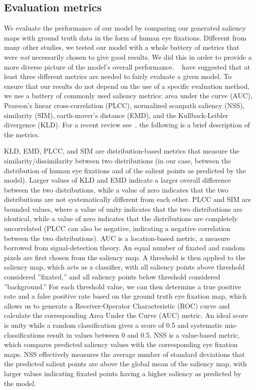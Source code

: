 \subsection{Evaluation metrics}

We evaluate the performance of our model by comparing our generated saliency maps with ground truth data in the form of human eye fixations. Different from many other studies, we tested our model with a whole battery of metrics that were {\em not} necessarily chosen to give good results. We did this in order to provide a more diverse picture of the model's overall performance. ~\cite{Riche_etal13} have suggested that at least three different metrics are needed to fairly evaluate a given model. To ensure that our results do not depend on the use of a specific evaluation method, we use a battery of commonly used saliency metrics: area under the curve (AUC), Pearson's linear cross-correlation (PLCC), normalized scanpath saliency (NSS), similarity (SIM), earth-mover's distance (EMD), and the Kullback-Leibler divergence (KLD). For a recent review see~\cite{Riche_etal13}, the following is a brief description of the metrics.

KLD, EMD, PLCC, and SIM are distribution-based metrics that measure the similarity/dissimilarity between two distributions (in our case, between the distribution of human eye fixations and of the salient points as predicted by the model). Larger values of KLD and EMD indicate a larger overall difference between the two distributions, while a value of zero indicates that the two distributions are not systematically different from each other. PLCC and SIM are bounded values, where a value of unity indicates that the two distributions are identical, while a value of zero indicates that the distributions are completely uncorrelated (PLCC can also be negative, indicating a negative correlation between the two distributions). AUC is a location-based metric, a measure borrowed from signal-detection theory. An equal number of fixated and random pixels are first chosen from the saliency map. A threshold is then applied to the saliency map, which acts as a classifier, with all saliency points above threshold considered ''fixated,'' and all saliency points below threshold considered ''background.'' For each threshold value, we can then determine a true positive rate and a false positive rate based on the ground truth eye fixation map, which allows us to generate a Receiver-Operator Characteristic (ROC) curve and calculate the corresponding Area Under the Curve (AUC) metric. An ideal score is unity while a random classification gives a score of 0.5 and systematic mis-classifications result in values between 0 and 0.5. NSS is a value-based metric, which compares predicted saliency values with the corresponding eye fixation maps. NSS effectively measures the average number of standard deviations that the predicted salient points are above the global mean of the saliency map, with larger values indicating fixated points having a higher saliency as predicted by the model.

